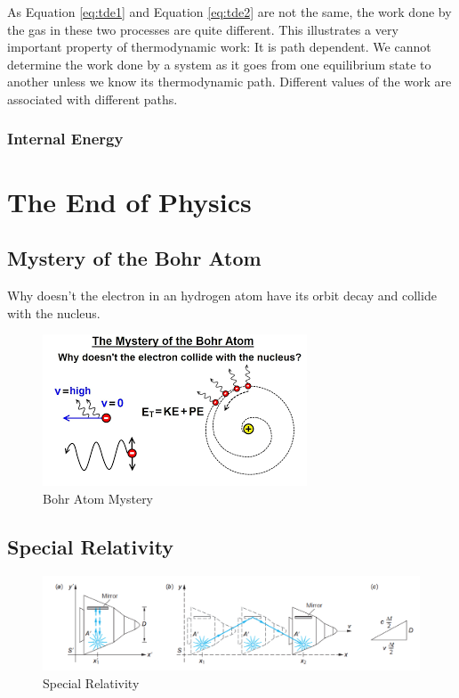 \documentclass[14pt]{memoir}
\begin{document}
As Equation \ref{eq:tde1} and Equation \ref{eq:tde2} are not the same, the work done by the gas in these two processes are quite different. This illustrates a very important property of thermodynamic work: It is path dependent. We cannot determine the work done by a system as it goes from one equilibrium state to another unless we know its thermodynamic path. Different values of the work are associated with different paths.

\subsection{Internal Energy}

\chapter{The End of Physics}

\section{Mystery of the Bohr Atom}

Why doesn't the electron in an hydrogen atom have its orbit decay and collide with the nucleus.

\begin{figure}[H]
\begin{center}
\includegraphics[scale=.6]{fig/bohrmystery.png}
\caption{Bohr Atom Mystery}
\label{fig:bm}
\end{center}
\end{figure} 

\section{Special Relativity}

\begin{figure}[H]
\begin{center}
\includegraphics[scale=0.5]{fig/lightclock.png}
\caption{Special Relativity}
\label{fig:lc}
\end{center}
\end{figure} 
\end{document}

